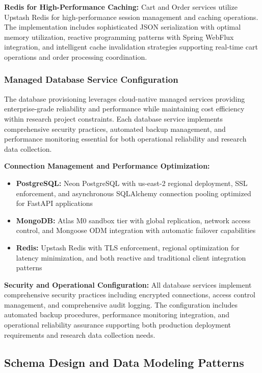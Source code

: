 \textbf{Redis for High-Performance Caching:}
Cart and Order services utilize Upstash Redis for high-performance session management and caching operations. The implementation includes sophisticated JSON serialization with optimal memory utilization, reactive programming patterns with Spring WebFlux integration, and intelligent cache invalidation strategies supporting real-time cart operations and order processing coordination.

\subsubsection{Managed Database Service Configuration}

The database provisioning leverages cloud-native managed services providing enterprise-grade reliability and performance while maintaining cost efficiency within research project constraints. Each database service implements comprehensive security practices, automated backup management, and performance monitoring essential for both operational reliability and research data collection.

\textbf{Connection Management and Performance Optimization:}
\begin{itemize}
\item \textbf{PostgreSQL:} Neon PostgreSQL with us-east-2 regional deployment, SSL enforcement, and asynchronous SQLAlchemy connection pooling optimized for FastAPI applications
\item \textbf{MongoDB:} Atlas M0 sandbox tier with global replication, network access control, and Mongoose ODM integration with automatic failover capabilities
\item \textbf{Redis:} Upstash Redis with TLS enforcement, regional optimization for latency minimization, and both reactive and traditional client integration patterns
\end{itemize}

\textbf{Security and Operational Configuration:}
All database services implement comprehensive security practices including encrypted connections, access control management, and comprehensive audit logging. The configuration includes automated backup procedures, performance monitoring integration, and operational reliability assurance supporting both production deployment requirements and research data collection needs.

\subsection{Schema Design and Data Modeling Patterns}

